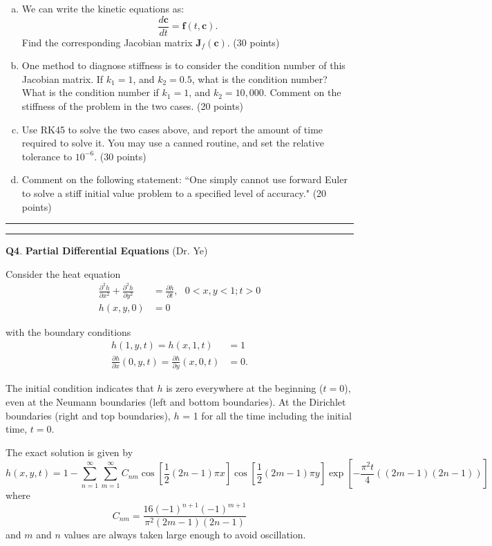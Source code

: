 \documentclass[11pt,letterpaper]{article}
\newcommand{\highlight}[1]{\textcolor{BrickRed}{#1}}
\begin{document}
\begin{enumerate}[a)]
\item We can write the kinetic equations as:
$$\frac{d\mathbf{c}}{dt} = \mathbf{f}(t,\mathbf{c}).$$
Find the corresponding Jacobian matrix $\mathbf{J}_f(\mathbf{c})$. (30 points)
\item One method to diagnose stiffness is to consider the condition number of this Jacobian matrix. If $k_1 = 1$, and $k_2 = 0.5$, what is the condition number? What is the condition number if $k_1 = 1$, and $k_2 = 10,000$. Comment on the stiffness of the problem in the two cases. (20 points)
\item Use RK45 to solve the two cases above, and report the amount of time required to solve it. You may use a canned routine, and set the relative tolerance to $10^{-6}$. (30 points)
\item Comment on the following statement: ``One simply cannot use forward Euler to solve a stiff initial value problem to a specified level of accuracy." (20 points)


\end{enumerate}

\bigskip
\hrule \medskip

\pagebreak
\hrule 
\medskip
\textbf{Q4}. \highlight{\textbf{Partial Differential Equations}} (Dr. Ye)
\label{q4}
\bigskip

Consider the heat equation
\begin{align*}
\frac{\partial^2 h}{\partial x^2} + \frac{\partial^2 h}{\partial y^2} & = \frac{\partial h}{\partial t},~~~ 0 < x, y < 1; t > 0 \\
h(x,y,0) & = 0
\end{align*}

with the boundary conditions
\begin{align*}
h(1,y,t) = h(x,1,t) & = 1\\
\frac{\partial h}{\partial x}(0,y,t) = \frac{\partial h}{\partial y}(x,0,t) & = 0.
\end{align*}

The initial condition  indicates that $h$ is zero everywhere at the beginning ($t = 0$), even at the Neumann boundaries (left and bottom boundaries). At the Dirichlet boundaries (right and top boundaries), $h$ = 1 for all the time including the initial time, $t = 0$.  

\medskip

The exact solution is given by
$$h(x,y,t) = 1 - \sum_{n=1}^{\infty} \sum_{m=1}^{\infty} C_{nm} \cos \left[\frac12 (2n-1)\pi x \right] \cos \left[\frac12 (2m-1)\pi y \right] \exp\left[-\frac{\pi^2 t}{4} \left((2m-1)(2n-1)\right) \right]$$
where
$$C_{nm} = \frac{16 (-1)^{n+1} (-1)^{m+1}}{\pi^2 (2m-1)(2n-1)}$$
and $m$ and $n$ values are always taken large enough to avoid oscillation.   
\end{document}
